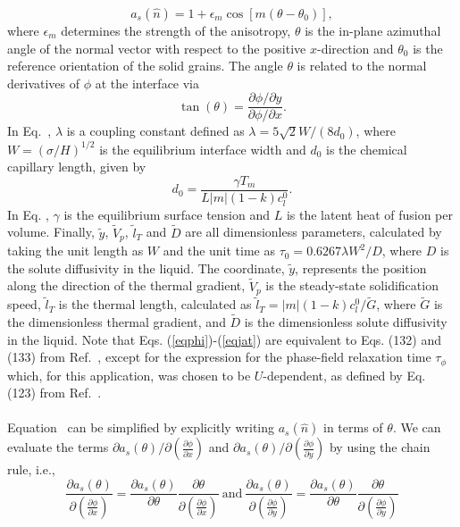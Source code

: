 \documentclass[10pt]{article}
\begin{document}
\begin{equation}
a_s(\hat{n})=1+\epsilon_m \cos[m(\theta-\theta_0)],
\end{equation}
where $\epsilon_m$ determines the strength of the anisotropy, $\theta$ is the in-plane azimuthal angle of the normal vector with respect to the positive $x$-direction and $\theta_0$ is the reference orientation of the solid grains. The angle $\theta$ is related to the normal derivatives of $\phi$ at the interface via 
\begin{equation}
\label{taneq}
\tan(\theta) = \frac{\partial \phi / \partial y}{\partial \phi / \partial x}. 
\end{equation}
In Eq.~, $\lambda$ is a coupling constant defined as $\lambda=5\sqrt{2}W/(8d_0)$, where $W=(\sigma/H)^{1/2}$ is the equilibrium interface width and $d_0$ is the chemical capillary length, given by
\begin{equation}
\label{clength}
d_0=\frac{\gamma T_m}{L |m| (1-k) c_l^0}.
\end{equation}
In Eq. , $\gamma$ is the equilibrium surface tension and $L$ is the latent heat of fusion per volume. Finally, $\tilde{y}$, $\tilde{V}_p$, $\tilde{l}_T$ and $\tilde{D}$ are all dimensionless parameters, calculated by taking the unit length as $W$ and the unit time as $\tau_0=0.6267\lambda W^2/D$, where $D$ is the solute diffusivity in the liquid. The coordinate, $\tilde{y}$, represents the position along the direction of the thermal gradient, $\tilde{V}_p$ is the steady-state solidification speed,  $\tilde{l}_T$ is the thermal length, calculated as $\tilde{l}_T=|m|(1-k)c_l^0/\tilde{G}$, where $\tilde{G}$ is the dimensionless thermal gradient, and $\tilde{D}$ is the dimensionless solute diffusivity in the liquid. Note that Eqs. (\ref{eqphi})-(\ref{eqjat}) are equivalent to Eqs. (132) and (133) from Ref.~\cite{Echebarria2004}, except for the expression for the phase-field relaxation time $\tau_\phi$ which, for this application, was chosen to be $U$-dependent, as defined by Eq. (123) from Ref.~\cite{Echebarria2004}.\\
\\
Equation~ can be simplified by explicitly writing $a_s(\hat{n})$ in terms of $\theta$.  We can evaluate the terms $\partial a_s(\theta)/\partial \left( \frac{\partial \phi}{\partial x} \right)$ and $\partial a_s(\theta)/\partial \left( \frac{\partial \phi}{\partial y} \right)$ by using the chain rule, i.e.,
\[
\frac{\partial a_s(\theta)}{\partial \left( \frac{\partial \phi}{\partial x} \right)}=\frac{\partial a_s(\theta)}{\partial \theta} \frac{\partial \theta}{\partial \left( \frac{\partial \phi}{\partial x} \right)}\ \mathrm{and}\ \frac{\partial a_s(\theta)}{\partial \left( \frac{\partial \phi}{\partial y} \right)}=\frac{\partial a_s(\theta)}{\partial \theta} \frac{\partial \theta}{\partial \left( \frac{\partial \phi}{\partial y} \right)}
\]
\end{document}
